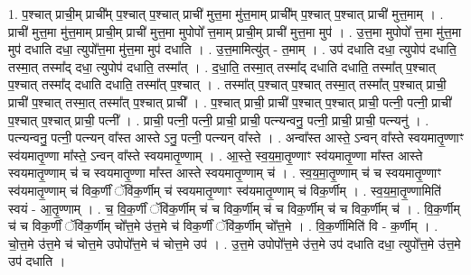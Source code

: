 \documentclass[17pt]{extarticle}
\begin{document}
1. प॒श्चात् प्राची॒म् प्राची᳚म् प॒श्चात् प॒श्चात् प्राची॑ मुत्त॒मा मु॑त्त॒माम् प्राची᳚म् प॒श्चात् प॒श्चात् प्राची॑ मुत्त॒माम् । . प्राची॑ मुत्त॒मा मु॑त्त॒माम् प्राची॒म् प्राची॑ मुत्त॒मा मुपोपो᳚ त्त॒माम् प्राची॒म् प्राची॑ मुत्त॒मा मुप॑ । . उ॒त्त॒मा मुपोपो᳚ त्त॒मा मु॑त्त॒मा मुप॑ दधाति दधा॒ त्युपो᳚त्त॒मा मु॑त्त॒मा मुप॑ दधाति । . उ॒त्त॒मामित्यु॑त् - त॒माम् । . उप॑ दधाति दधा॒ त्युपोप॑ दधाति॒ तस्मा॒त् तस्मा᳚द् दधा॒ त्युपोप॑ दधाति॒ तस्मा᳚त् । . द॒धा॒ति॒ तस्मा॒त् तस्मा᳚द् दधाति दधाति॒ तस्मा᳚त् प॒श्चात् प॒श्चात् तस्मा᳚द् दधाति दधाति॒ तस्मा᳚त् प॒श्चात् । . तस्मा᳚त् प॒श्चात् प॒श्चात् तस्मा॒त् तस्मा᳚त् प॒श्चात् प्राची॒ प्राची॑ प॒श्चात् तस्मा॒त् तस्मा᳚त् प॒श्चात् प्राची᳚ । . प॒श्चात् प्राची॒ प्राची॑ प॒श्चात् प॒श्चात् प्राची॒ पत्नी॒ पत्नी॒ प्राची॑ प॒श्चात् प॒श्चात् प्राची॒ पत्नी᳚ । . प्राची॒ पत्नी॒ पत्नी॒ प्राची॒ प्राची॒ पत्न्यन्वनु॒ पत्नी॒ प्राची॒ प्राची॒ पत्न्यनु॑ । . पत्न्यन्वनु॒ पत्नी॒ पत्न्यन् वा᳚स्त आस्ते ऽनु॒ पत्नी॒ पत्न्यन् वा᳚स्ते । . अन्वा᳚स्त आस्ते॒ ऽन्वन् वा᳚स्ते स्वयमातृ॒ण्णाꣳ स्व॑यमातृ॒ण्णा मा᳚स्ते॒ ऽन्वन् वा᳚स्ते स्वयमातृ॒ण्णाम् । . आ॒स्ते॒ स्व॒य॒मा॒तृ॒ण्णाꣳ स्व॑यमातृ॒ण्णा मा᳚स्त आस्ते स्वयमातृ॒ण्णाम् च॑ च स्वयमातृ॒ण्णा मा᳚स्त आस्ते स्वयमातृ॒ण्णाम् च॑ । . स्व॒य॒मा॒तृ॒ण्णाम् च॑ च स्वयमातृ॒ण्णाꣳ स्व॑यमातृ॒ण्णाम् च॑ विक॒र्णीं ॅवि॑क॒र्णीम् च॑ स्वयमातृ॒ण्णाꣳ स्व॑यमातृ॒ण्णाम् च॑ विक॒र्णीम् । . स्व॒य॒मा॒तृ॒ण्णामिति॑ स्वयं - आ॒तृ॒ण्णाम् । . च॒ वि॒क॒र्णीं ॅवि॑क॒र्णीम् च॑ च विक॒र्णीम् च॑ च विक॒र्णीम् च॑ च विक॒र्णीम् च॑ । . वि॒क॒र्णीम् च॑ च विक॒र्णीं ॅवि॑क॒र्णीम् चो᳚त्त॒मे उ॑त्त॒मे च॑ विक॒र्णीं ॅवि॑क॒र्णीम् चो᳚त्त॒मे । . वि॒क॒र्णीमिति॑ वि - क॒र्णीम् । . चो॒त्त॒मे उ॑त्त॒मे च॑ चोत्त॒मे उपोपो᳚त्त॒मे च॑ चोत्त॒मे उप॑ । . उ॒त्त॒मे उपोपो᳚त्त॒मे उ॑त्त॒मे उप॑ दधाति दधा॒ त्युपो᳚त्त॒मे उ॑त्त॒मे उप॑ दधाति । \newline
\end{document}
